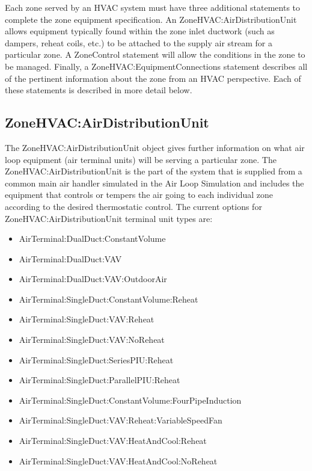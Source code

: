 Each zone served by an HVAC system must have three additional statements to complete the zone equipment specification. An ZoneHVAC:AirDistributionUnit allows equipment typically found within the zone inlet ductwork (such as dampers, reheat coils, etc.) to be attached to the supply air stream for a particular zone. A ZoneControl statement will allow the conditions in the zone to be managed. Finally, a ZoneHVAC:EquipmentConnections statement describes all of the pertinent information about the zone from an HVAC perspective. Each of these statements is described in more detail below.

\subsection{ZoneHVAC:AirDistributionUnit}\label{zonehvacairdistributionunit}

The ZoneHVAC:AirDistributionUnit object gives further information on what air loop equipment (air terminal units) will be serving a particular zone. The ZoneHVAC:AirDistributionUnit is the part of the system that is supplied from a common main air handler simulated in the Air Loop Simulation and includes the equipment that controls or tempers the air going to each individual zone according to the desired thermostatic control. The current options for ZoneHVAC:AirDistributionUnit terminal unit types are:

\begin{itemize}
\item
  AirTerminal:DualDuct:ConstantVolume
\item
  AirTerminal:DualDuct:VAV
\item
  AirTerminal:DualDuct:VAV:OutdoorAir
\item
  AirTerminal:SingleDuct:ConstantVolume:Reheat
\item
  AirTerminal:SingleDuct:VAV:Reheat
\item
  AirTerminal:SingleDuct:VAV:NoReheat
\item
  AirTerminal:SingleDuct:SeriesPIU:Reheat
\item
  AirTerminal:SingleDuct:ParallelPIU:Reheat
\item
  AirTerminal:SingleDuct:ConstantVolume:FourPipeInduction
\item
  AirTerminal:SingleDuct:VAV:Reheat:VariableSpeedFan
\item
  AirTerminal:SingleDuct:VAV:HeatAndCool:Reheat
\item
  AirTerminal:SingleDuct:VAV:HeatAndCool:NoReheat
\end{itemize}

